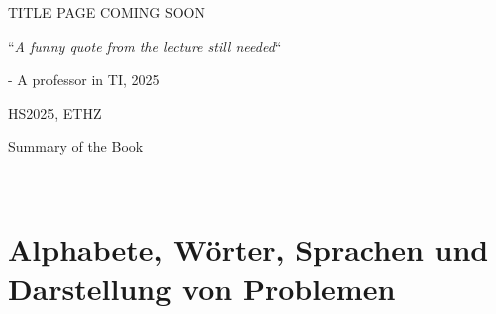 \documentclass{article}
\begin{document}
\startDocument
\usetcolorboxes

\vspace{2cm}
\begin{Huge}
    \begin{center}
        TITLE PAGE COMING SOON
    \end{center}
\end{Huge}


\vspace{4cm}
\begin{center}
    \begin{Large}
        ``\textit{A funny quote from the lecture still needed}``
    \end{Large}

    \hspace{3cm} - A professor in TI, 2025
\end{center}

\vspace{3cm}
\begin{center}
    HS2025, ETHZ\\[0.2cm]
    \begin{Large}
        Summary of the Book
    \end{Large}\\[0.2cm]
\end{center}

\newpage


\newpage





\newsection
\section{Alphabete, Wörter, Sprachen und Darstellung von Problemen}


\end{document}
